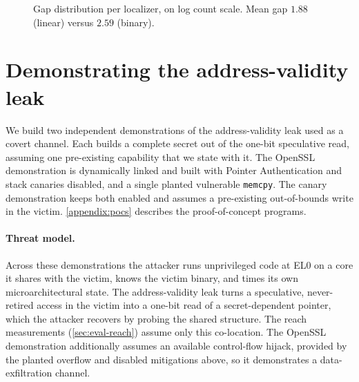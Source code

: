 \begin{figure}[t]
\centering
{}
\caption{Gap distribution per localizer, on log count scale. Mean gap $1.88$ (linear) versus $2.59$
(binary).}
\label{fig:eval-gaps}
\end{figure}

\section{Demonstrating the address-validity leak}
\label{sec:eval-demo}

We build two independent demonstrations of the address-validity leak used as a covert channel. Each
builds a complete secret out of the one-bit speculative read, assuming one pre-existing capability
that we state with it. The
OpenSSL demonstration is dynamically linked and built with Pointer Authentication and stack canaries
disabled, and a single planted vulnerable \texttt{memcpy}. The canary demonstration keeps both
enabled and assumes a pre-existing out-of-bounds write in the victim. \autoref{appendix:pocs}
describes the proof-of-concept programs.

\paragraph{Threat model.}
Across these demonstrations the attacker runs unprivileged code at EL0 on a core it shares with the
victim, knows the victim binary, and times its own microarchitectural state. The address-validity
leak turns a speculative, never-retired access in the victim into a one-bit read of a
secret-dependent pointer, which the attacker recovers by probing the shared structure. The reach
measurements (\autoref{sec:eval-reach}) assume only this co-location. The OpenSSL demonstration
additionally assumes an available control-flow hijack, provided by the planted overflow and disabled
mitigations above, so it demonstrates a data-exfiltration channel.

